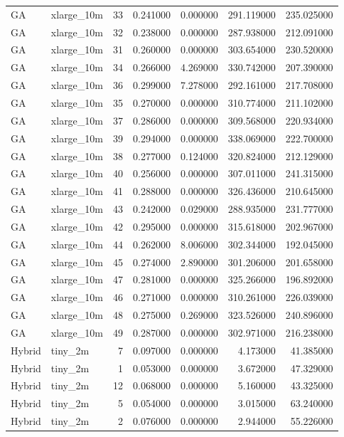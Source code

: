 \begin{tabular}{llrrrrr}
GA & xlarge_10m & 33 & 0.241000 & 0.000000 & 291.119000 & 235.025000 \\
GA & xlarge_10m & 32 & 0.238000 & 0.000000 & 287.938000 & 212.091000 \\
GA & xlarge_10m & 31 & 0.260000 & 0.000000 & 303.654000 & 230.520000 \\
GA & xlarge_10m & 34 & 0.266000 & 4.269000 & 330.742000 & 207.390000 \\
GA & xlarge_10m & 36 & 0.299000 & 7.278000 & 292.161000 & 217.708000 \\
GA & xlarge_10m & 35 & 0.270000 & 0.000000 & 310.774000 & 211.102000 \\
GA & xlarge_10m & 37 & 0.286000 & 0.000000 & 309.568000 & 220.934000 \\
GA & xlarge_10m & 39 & 0.294000 & 0.000000 & 338.069000 & 222.700000 \\
GA & xlarge_10m & 38 & 0.277000 & 0.124000 & 320.824000 & 212.129000 \\
GA & xlarge_10m & 40 & 0.256000 & 0.000000 & 307.011000 & 241.315000 \\
GA & xlarge_10m & 41 & 0.288000 & 0.000000 & 326.436000 & 210.645000 \\
GA & xlarge_10m & 43 & 0.242000 & 0.029000 & 288.935000 & 231.777000 \\
GA & xlarge_10m & 42 & 0.295000 & 0.000000 & 315.618000 & 202.967000 \\
GA & xlarge_10m & 44 & 0.262000 & 8.006000 & 302.344000 & 192.045000 \\
GA & xlarge_10m & 45 & 0.274000 & 2.890000 & 301.206000 & 201.658000 \\
GA & xlarge_10m & 47 & 0.281000 & 0.000000 & 325.266000 & 196.892000 \\
GA & xlarge_10m & 46 & 0.271000 & 0.000000 & 310.261000 & 226.039000 \\
GA & xlarge_10m & 48 & 0.275000 & 0.269000 & 323.526000 & 240.896000 \\
GA & xlarge_10m & 49 & 0.287000 & 0.000000 & 302.971000 & 216.238000 \\
Hybrid & tiny_2m & 7 & 0.097000 & 0.000000 & 4.173000 & 41.385000 \\
Hybrid & tiny_2m & 1 & 0.053000 & 0.000000 & 3.672000 & 47.329000 \\
Hybrid & tiny_2m & 12 & 0.068000 & 0.000000 & 5.160000 & 43.325000 \\
Hybrid & tiny_2m & 5 & 0.054000 & 0.000000 & 3.015000 & 63.240000 \\
Hybrid & tiny_2m & 2 & 0.076000 & 0.000000 & 2.944000 & 55.226000 \\

\end{tabular}
